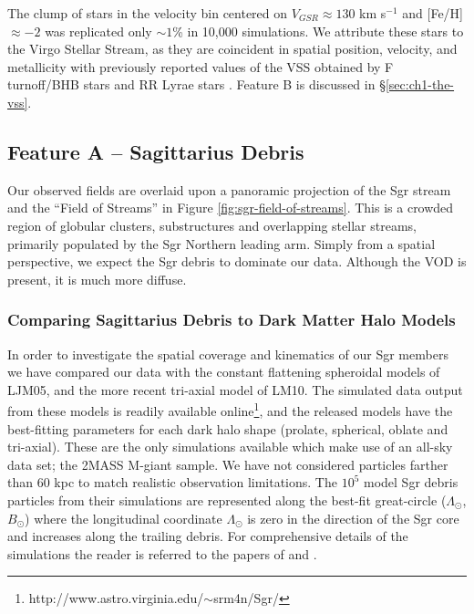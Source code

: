 	 The clump of stars in the velocity bin centered on $V_{GSR} \approx 130$ km s$^{-1}$ and [Fe/H] $\approx -2$ was replicated only $\sim1$\% in 10,000 simulations. We attribute these stars to the Virgo Stellar Stream, as they are coincident in spatial position, velocity, and metallicity with previously reported values of the VSS obtained by F turnoff/BHB stars \citep{Newberg;et-al_2007} and RR Lyrae stars \citep{Prior;et-al_2009a}. Feature B is discussed in \S\ref{sec:ch1-the-vss}.

	
	\subsection{Feature A \--- Sagittarius Debris}
	\label{sec:ch1-sgr-debris}
	
	  Our observed fields are overlaid upon a panoramic projection of the Sgr stream and the  ``Field of Streams''  \citep{Belokurov;et-al_2006} in Figure \ref{fig:sgr-field-of-streams}. This is a crowded region of globular clusters, substructures and overlapping stellar streams, primarily populated by the Sgr Northern leading arm. Simply from a spatial perspective, we expect the Sgr debris to dominate our data. Although the VOD is present, it is much more diffuse. 
	
	\subsubsection{Comparing Sagittarius Debris to Dark Matter Halo Models}	

	In order to investigate the spatial coverage and kinematics of our Sgr members we have compared our data with the constant flattening spheroidal models of LJM05, and the more recent tri-axial model of LM10. The simulated data output from these models is readily available online\footnote{http://www.astro.virginia.edu/$\sim$srm4n/Sgr/}, and the released models have the best-fitting parameters for each dark halo shape (prolate, spherical, oblate and tri-axial).  These are the only simulations available which make use of an all-sky data set; the 2MASS M-giant sample. We have not considered particles farther than 60 kpc to match realistic observation limitations.  The $10^5$ model Sgr debris particles from their simulations are represented along the best-fit great-circle ($\Lambda_\odot$, $B_\odot$) where the longitudinal coordinate $\Lambda_\odot$ is zero in the direction of the Sgr core and increases along the trailing debris. For comprehensive details of the simulations the reader is referred to the papers of \citet{Law;et-al_2005} and \citet{Law;Majewski_2010}. 
		
